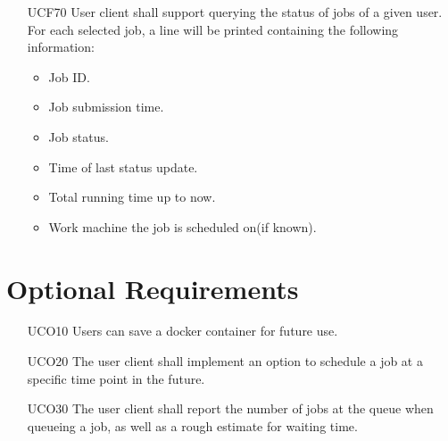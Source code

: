 \begin{itemize}
  \item[UCF70] User client shall support querying the status of jobs of a given user.
    For each selected job, a line will be printed containing the following information:
    \begin{itemize}
      \item Job ID.
      \item Job submission time.
      \item Job status.
      \item Time of last status update.
      \item Total running time up to now.
      \item Work machine the job is scheduled on(if known).
    \end{itemize}
\end{itemize}

\section{Optional Requirements}
\begin{itemize}
  \item [UCO10] Users can save a docker container for future use.
  \item [UCO20] The user client shall implement an option to schedule a job at a specific time point in the future.
  \item [UCO30] The user client shall report the number of jobs at the queue when queueing a job, as well as a rough estimate for waiting time.
\end{itemize}


